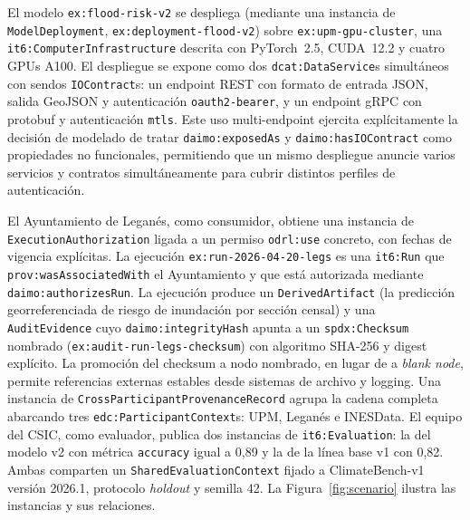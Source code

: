 \documentclass[11pt,a4paper]{article}
\newcommand{\code}[1]{\texttt{#1}}
\begin{document}
El modelo \code{ex:flood-risk-v2} se despliega (mediante una instancia de \code{ModelDeployment}, \code{ex:deployment-flood-v2}) sobre \code{ex:upm-gpu-cluster}, una \code{it6:ComputerInfrastructure} descrita con PyTorch~2.5, CUDA~12.2 y cuatro GPUs A100. El despliegue se expone como dos \code{dcat:DataService}s simultáneos con sendos \code{IOContract}s: un endpoint REST con formato de entrada JSON, salida GeoJSON y autenticación \code{oauth2-bearer}, y un endpoint gRPC con protobuf y autenticación \code{mtls}. Este uso multi-endpoint ejercita explícitamente la decisión de modelado de tratar \code{daimo:exposedAs} y \code{daimo:hasIOContract} como propiedades no funcionales, permitiendo que un mismo despliegue anuncie varios servicios y contratos simultáneamente para cubrir distintos perfiles de autenticación.

El Ayuntamiento de Leganés, como consumidor, obtiene una instancia de \code{ExecutionAuthorization} ligada a un permiso \code{odrl:use} concreto, con fechas de vigencia explícitas. La ejecución \code{ex:run-2026-04-20-legs} es una \code{it6:Run} que \code{prov:wasAssociatedWith} el Ayuntamiento y que está autorizada mediante \code{daimo:authorizesRun}. La ejecución produce un \code{DerivedArtifact} (la predicción georreferenciada de riesgo de inundación por sección censal) y una \code{AuditEvidence} cuyo \code{daimo:integrityHash} apunta a un \code{spdx:Checksum} nombrado (\code{ex:audit-run-legs-checksum}) con algoritmo SHA-256 y digest explícito. La promoción del checksum a nodo nombrado, en lugar de a \emph{blank node}, permite referencias externas estables desde sistemas de archivo y logging. Una instancia de \code{CrossParticipantProvenanceRecord} agrupa la cadena completa abarcando tres \code{edc:ParticipantContext}s: UPM, Leganés e INESData. El equipo del CSIC, como evaluador, publica dos instancias de \code{it6:Evaluation}: la del modelo v2 con métrica \code{accuracy} igual a 0,89 y la de la línea base v1 con 0,82. Ambas comparten un \code{SharedEvaluationContext} fijado a ClimateBench-v1 versión 2026.1, protocolo \emph{holdout} y semilla 42. La Figura~\ref{fig:scenario} ilustra las instancias y sus relaciones.
\end{document}
